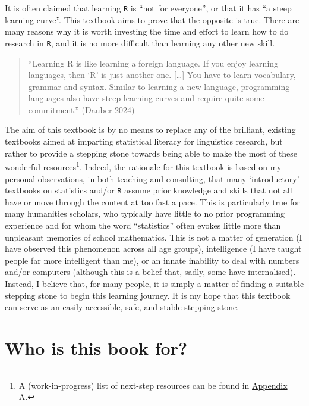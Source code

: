 \documentclass[
  letterpaper,
  DIV=11,
  numbers=noendperiod]{scrreprt}
\begin{document}
It is often claimed that learning \texttt{R} is ``not for everyone'', or
that it has ``a steep learning curve''. This textbook aims to prove that
the opposite is true. There are many reasons why it is worth investing
the time and effort to learn how to do research in \texttt{R}, and it is
no more difficult than learning any other new skill.

\begin{quote}
``Learning R is like learning a foreign language. If you enjoy learning
languages, then `R' is just another one. {[}\ldots{]} You have to learn
vocabulary, grammar and syntax. Similar to learning a new language,
programming languages also have steep learning curves and require quite
some commitment.'' (Dauber 2024)
\end{quote}

The aim of this textbook is by no means to replace any of the brilliant,
existing textbooks aimed at imparting statistical literacy for
linguistics research, but rather to provide a stepping stone towards
being able to make the most of these wonderful resources\footnote{A
  (work-in-progress) list of next-step resources can be found in
  \href{https://elenlefoll.github.io/RstatsTextbook/FurtherResources.html}{Appendix
  A}.}. Indeed, the rationale for this textbook is based on my personal
observations, in both teaching and consulting, that many `introductory'
textbooks on statistics and/or \texttt{R} assume prior knowledge and
skills that not all have or move through the content at too fast a pace.
This is particularly true for many humanities scholars, who typically
have little to no prior programming experience and for whom the word
``statistics'' often evokes little more than unpleasant memories of
school mathematics. This is not a matter of generation (I have observed
this phenomenon across all age groups), intelligence (I have taught
people far more intelligent than me), or an innate inability to deal
with numbers and/or computers (although this is a belief that, sadly,
some have internalised). Instead, I believe that, for many people, it is
simply a matter of finding a suitable stepping stone to begin this
learning journey. It is my hope that this textbook can serve as an
easily accessible, safe, and stable stepping stone.

\section*{Who is this book for?}\label{who-is-this-book-for}
\end{document}
